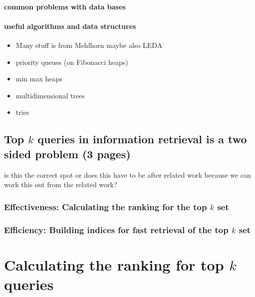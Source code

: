 \documentclass[•]{book}
\begin{document}
\subsection{common problems with data bases}
\subsection{useful algorithms and data structures}
\begin{itemize}
\item Many stuff is from Mehlhorn \cite{rw:algodat:Mehlhorn:1990} maybe also LEDA
\item priority queues (on Fibonacci heaps)
\item min max heaps
\item multidimensional trees
\item tries
\end{itemize}


\chapter{Top $k$ queries in information retrieval is a two sided problem (3 pages)}
is this the correct spot or does this have to be after related work because we can work this out from the related work?
\section{Effectiveness: Calculating the ranking for the top $k$ set}
\section{Efficiency: Building indices for fast retrieval of the top $k$ set}

\part{Calculating the ranking for top $k$ queries}
\end{document}
